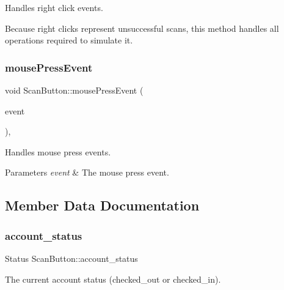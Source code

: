 Handles right click events. 

Because right clicks represent unsuccessful scans, this method handles all operations required to simulate it. \mbox{\label{classScanButton_ad2d0bac19d1ec704cbdf2bc07b0b8641}} 
\subsubsection{\texorpdfstring{mouse\+Press\+Event}{mousePressEvent}}
{\footnotesize\ttfamily void Scan\+Button\+::mouse\+Press\+Event (\begin{DoxyParamCaption}\item[{Q\+Mouse\+Event $\ast$}]{event }\end{DoxyParamCaption})\hspace{0.3cm}{\ttfamily [protected]}, {\ttfamily [slot]}}



Handles mouse press events. 


\begin{DoxyParams}{Parameters}
{\em event} & The mouse press event. \\
\hline
\end{DoxyParams}


\subsection{Member Data Documentation}
\mbox{\label{classScanButton_a22c7452ff6724ab7c1aa08f6af142ea7}} 
\subsubsection{\texorpdfstring{account\+\_\+status}{account\_status}}
{\footnotesize\ttfamily Status Scan\+Button\+::account\+\_\+status\hspace{0.3cm}{\ttfamily [protected]}}

The current account status (checked\+\_\+out or checked\+\_\+in). \mbox{\label{classScanButton_a6b492c7a79ec5cf43b5b4f6f20aed636}} 
